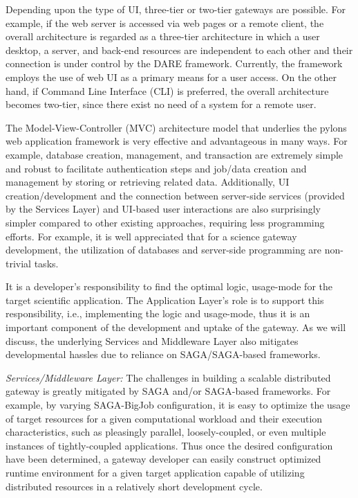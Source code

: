 \documentclass{sig-alternate}
\begin{document}
Depending upon the type of UI, three-tier or two-tier gateways are
possible.  For example, if the web server is accessed via web pages or
a remote client, the overall architecture is regarded as a three-tier
architecture in which a user desktop, a server, and back-end resources
are independent to each other and their connection is under control by
the DARE framework.  Currently, the framework employs the use of web
UI as a primary means for a user access.  On the other hand, if
Command Line Interface (CLI) is preferred, the overall architecture
becomes two-tier, since there exist no need of a system for a remote
user.  %

The Model-View-Controller (MVC) architecture model that underlies the
pylons web application framework\cite{pylonsurl} is very effective and advantageous in
many ways. For example, database creation, management, and transaction
are extremely simple and robust to facilitate authentication steps and
job/data creation and management by storing or retrieving related
data.  Additionally, UI creation/development and the connection
between server-side services (provided by the Services Layer) and
UI-based user interactions are also surprisingly simpler compared to
other existing approaches, requiring less programming efforts.  For
example, it is well appreciated that for a science gateway
development, the utilization of databases and server-side programming
are non-trivial tasks.

It is a developer's responsibility to find the optimal logic,
usage-mode for the target scientific application.  The Application
Layer's role is to support this responsibility, i.e., implementing the
logic and usage-mode, thus it is an important component of the
development and uptake of the gateway. As we will discuss, the
underlying Services and Middleware Layer also mitigates developmental
hassles due to reliance on SAGA/SAGA-based frameworks.


\textit{Services/Middleware Layer:} The challenges in building a
scalable distributed gateway is greatly mitigated by SAGA and/or
SAGA-based frameworks.  For example, by varying SAGA-BigJob
configuration, it is easy to optimize the usage of target resources
for a given computational workload and their execution
characteristics, such as pleasingly parallel, loosely-coupled, or even
multiple instances of tightly-coupled applications.  Thus once the
desired configuration have been determined, a gateway developer can
easily construct optimized runtime environment for a given target
application capable of utilizing distributed resources in a relatively
short development cycle.
\end{document}
